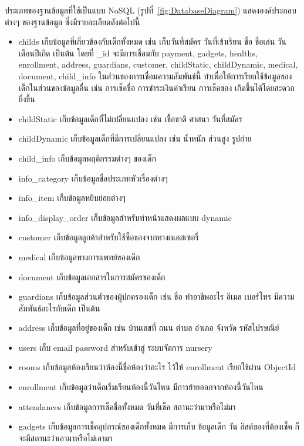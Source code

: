 ประเภทของฐานข้อมูลที่ใช้เป็นแบบ NoSQL
(รูปที่~\ref{fig:DatabaseDiagram}) แสดงองค์ประกอบต่างๆ ของฐานข้อมูล ซึ่งมีรายละเอียดดังต่อไปนี้
%
  \begin{itemize}
    \item childs เก็บข้อมูลที่เกี่ยวข้องกับเด็กทั้งหมด เช่น เก็บวันที่สมัคร วันที่เข้าเรียน ชื่อ ชื่อเล่น วันเดือนปีเกิด เป็นต้น  
    โดยที่ \_id จะมีการเชื่อมกับ payment, gadgets, healths, enrollment, address, guardians, customer, childStatic, childDynamic, medical, document, child\_info 
    ในส่วนของการเชื่อมความสัมพันธ์นี้ ทำเพื่อให้การเรียกใช้ข้อมูลของเด็กในส่วนของข้อมูลอื่น เช่น การเช็คชื่อ การชำระเงินค่าเรียน การเช็คของ เกิดขึ้นได้โดยสะดวกยิ่งขึ้น
    \item childStatic เก็บข้อมูลเด็กที่ไม่เปลี่ยนแปลง เช่น เชื้อชาติ ศาสนา วันที่สมัคร
    \item childDynamic เก็บข้อมูลเด็กที่มีการเปลี่ยนแปลง เช่น น้ำหนัก ส่วนสูง รูปถ่าย
    \item child\_info เก็บข้อมูลพฤติกรรมต่างๆ ของเด็ก
    \item info\_category เก็บข้อมูลชื่อประเภทหัวเรื่องต่างๆ
    \item info\_item เก็บข้อมูลหยิบย่อยต่างๆ
    \item info\_display\_order เก็บข้อมูลสำหรับทำหน้าแสดงผลแบบ dynamic
    \item customer เก็บข้อมูลลูกค้าสำหรับใช้ซื้อของจากทางเนอสเซอรี่
    \item medical เก็บข้อมูลทางการแพทย์ของเด็ก
    \item document เก็บข้อมูลเอกสารในการสมัครของเด็ก
    \item guardians เก็บข้อมูลส่วนตัวของผู้ปกครองเด็ก เช่น ชื่อ ทำอาชีพอะไร อีเมล เบอร์โทร มีความสัมพันธ์อะไรกับเด็ก เป็นต้น
    \item address เก็บข้อมูลที่อยู่ของเด็ก เช่น บ้านเลขที่ ถนน ตำบล อำเภอ จังหวัด รหัสไปรษณีย์ 
    \item users เก็บ email password สำหรับเข้าสู่ ระบบจัดการ nursery 
    \item rooms เก็บข้อมูลห้องเรียนว่าห้องนี้ชื่อห้องว่าอะไร ไว้ให้ enrollment เรียกใช้ผ่าน ObjectId
    \item enrollment เก็บข้อมูลว่าเด็กเริ่มเรียนห้องนี้วันไหน มีการย้ายออกจากห้องนี้วันไหน
    \item attendances เก็บข้อมูลการเช็คชื่อทั้งหมด วันที่เช็ค สถานะว่ามาหรือไม่มา
    \item gadgets เก็บข้อมูลการเช็คอุปกรณ์ของเด็กทั้งหมด มีการเก็บ ข้อมูลเด็ก วัน ลิสต์ของที่ต้องเช็ค ก็จะมีสถานะว่าเอามาหรือไม่เอามา

\end{itemize}
